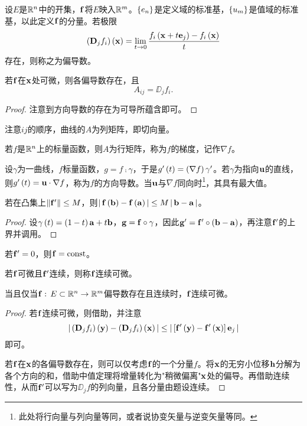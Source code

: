 \documentclass{ctexrep}
\begin{document}
  \begin{definition}
    设$E$是$\mathbb{R}^n$中的开集，$\mathbf{f}$将$E$映入$\mathbb{R}^m$。$\left\{e_n\right\}$是定义域的标准基，$\left\{u_m\right\}$是值域的标准基，以此定义$\mathbf{f}$的分量。若极限
    \[ \left(\mathbf{D}_jf_i\right)\left(\mathbf{x}\right) = \lim_{t\to 0}\frac{f_i\left(\mathbf{x}+t\mathbf{e}_j\right)-f_i\left(\mathbf{x}\right)}{t} \]
    存在，则称之为偏导数。
  \end{definition}
  \begin{theorem}
    \label{thm:adij}
    若$\mathbf{f}$在$\mathbf{x}$处可微，则各偏导数存在，且
    \[ A_{ij} = \DD_jf_i. \]
  \end{theorem}
  \begin{proof}
    注意到方向导数的存在为可导所蕴含即可。
  \end{proof}
  注意$ij$的顺序，曲线的$A$为列矩阵，即切向量。
  \begin{definition}若$f$是$\mathbb{R}^n$上的标量函数，则$A$为行矩阵，称为$f$的梯度，记作$\nabla f$。
  \end{definition}
  设$\gamma$为一曲线，$f$标量函数，$g=f \comp \gamma$，于是$g'\left(t\right) = \left(\nabla f\right)\gamma'$。若$\gamma$为指向$\mathbf{u}$的直线，则$g'\left(t\right)=\mathbf{u}\cdot\nabla f$，称为$f$的方向导数。当$\mathbf{u}$与$\nabla f$同向时\footnote{此处将行向量与列向量等同，或者说协变矢量与逆变矢量等同。}，其具有最大值。
  \begin{theorem}
    若在凸集上$\left\| \mathbf{f}' \right\|\le M$，则$\left|\, \mathbf{f}\left(\mathbf{b}\right)-\mathbf{f}\left(\mathbf{a}\right) \,\right| \le M \left|\, \mathbf{b}-\mathbf{a} \,\right|$。
  \end{theorem}
  \begin{proof}
    设$\gamma\left(t\right) = \left(1-t\right)\mathbf{a}+t\mathbf{b}$，$\mathbf{g}=\mathbf{f}\circ\gamma$，因此$\mathbf{g}'=\mathbf{f}'\circ\left(\mathbf{b}-\mathbf{a}\right)$，再注意$\mathbf{f}'$的上界并调用。
  \end{proof}
  \begin{collary}
    若$\mathbf{f}'=0$，则$\mathbf{f}=\mathrm{const}$。
  \end{collary}
  \begin{definition}
    若$\mathbf{f}$可微且$\mathbf{f}'$连续，则称$\mathbf{f}$连续可微。
  \end{definition}
  \begin{theorem}
    当且仅当$\mathbf{f}:\, E\subset\mathbb{R}^n \rightarrow \mathbb{R}^m$偏导数存在且连续时，$\mathbf{f}$连续可微。
  \end{theorem}
  \begin{proof}
    若$\mathbf{f}$连续可微，则借助，并注意
    \[ \left|\, \left(\mathbf{D}_jf_i\right)\left(\mathbf{y}\right)-\left(\mathbf{D}_jf_i\right)\left(\mathbf{x}\right) \,\right|\le\left|\, \left[\mathbf{f}'\left(\mathbf{y}\right)-\mathbf{f}'\left(\mathbf{x}\right)\right]\mathbf{e}_j \,\right| \]
    即可。
    \par
    若$\mathbf{f}$在$\mathbf{x}$的各偏导数存在，则可以仅考虑$\mathbf{f}$的一个分量$f$。将$\mathbf{x}$的无穷小位移$\mathbf{h}$分解为各个方向的和，借助中值定理将增量转化为"稍微偏离"$\mathbf{x}$处的偏导。再借助连续性，从而$\mathbf{f}'$可以写为$\DD_jf$的列向量，且各分量由题设连续。
  \end{proof}
\end{document}
